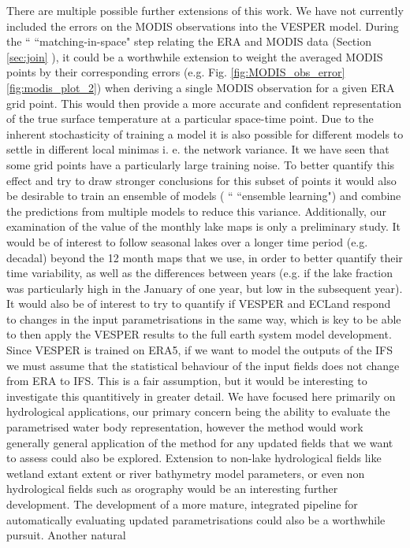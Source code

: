 \documentclass[hess, twostagejnl]{copernicus}
\providecommand{\DIFadd}[1]{{\protect\color{blue} \sf #1}} %
\providecommand{\DIFdel}[1]{{\protect\color{red} \scriptsize #1}} %
\providecommand{\DIFaddbegin}{} %
\providecommand{\DIFaddend}{} %
\providecommand{\DIFdelbegin}{} %
\providecommand{\DIFdelend}{} %
\begin{document}
\DIFdelbegin %
\DIFdelend There are multiple possible further extensions of this work. We have not currently included the errors on the MODIS observations into the VESPER model. During the \DIFdelbegin \DIFdel{``}\DIFdelend \DIFaddbegin \DIFadd{“}\DIFaddend matching-in-space" step relating the ERA and MODIS data (Section \DIFdelbegin \DIFdel{\ref{sec:join}}\DIFdelend \DIFaddbegin \DIFadd{2.2}\DIFaddend ), it could be a worthwhile extension to weight the averaged MODIS points by their corresponding errors (e.g. Fig. \DIFdelbegin \DIFdel{\ref{fig:MODIS_obs_error}}\DIFdelend \DIFaddbegin \DIFadd{\ref{fig:modis_plot_2}}\DIFaddend ) when deriving a single MODIS observation for a given ERA grid point. This would then provide a more accurate and confident representation of the true surface temperature at a particular space-time point. Due to the inherent stochasticity of training a model \DIFdelbegin \DIFdel{it is also possible for different models to settle in different local minimas i. e. the network variance. It }\DIFdelend \DIFaddbegin \DIFadd{we have seen that some grid points have a particularly large training noise. To better quantify this effect and try to draw stronger conclusions for this subset of points it }\DIFaddend would also be desirable to train an ensemble of models (\DIFdelbegin \DIFdel{``}\DIFdelend \DIFaddbegin \DIFadd{“}\DIFaddend ensemble learning") and combine the predictions from multiple models to reduce this variance. \DIFaddbegin \DIFadd{Additionally, our examination of the value of the monthly lake maps is only a preliminary study. It would be of interest to follow seasonal lakes over a longer time period (e.g. decadal) beyond the 12 month maps that we use, in order to better quantify their time variability, as well as the differences between years (e.g. if the lake fraction was particularly high in the January of one year, but low in the subsequent year). It would also be of interest to try to quantify if VESPER and ECLand respond to changes in the input parametrisations in the same way, which is key to be able to then apply the VESPER results to the full earth system model development. Since VESPER is trained on ERA5, if we want to model the outputs of the IFS we must assume that the statistical behaviour of the input fields does not change from ERA to IFS. This is a fair assumption, but it would be interesting to investigate this quantitively in greater detail. }\DIFaddend We have focused here primarily on hydrological applications, our primary concern being the ability to evaluate the parametrised water body representation, however the \DIFdelbegin \DIFdel{method would work generally }\DIFdelend \DIFaddbegin \DIFadd{general application of the method }\DIFaddend for any updated fields that we want to assess \DIFaddbegin \DIFadd{could also be explored}\DIFaddend . Extension to non-lake hydrological fields like wetland \DIFdelbegin \DIFdel{extant }\DIFdelend \DIFaddbegin \DIFadd{extent }\DIFaddend or river bathymetry model parameters, or even non hydrological fields such as orography would be an interesting further development. The development of a more mature, integrated pipeline for automatically evaluating updated parametrisations could also be a worthwhile pursuit. \DIFdelbegin \DIFdel{Another natural }\DIFdelend 
\end{document}
